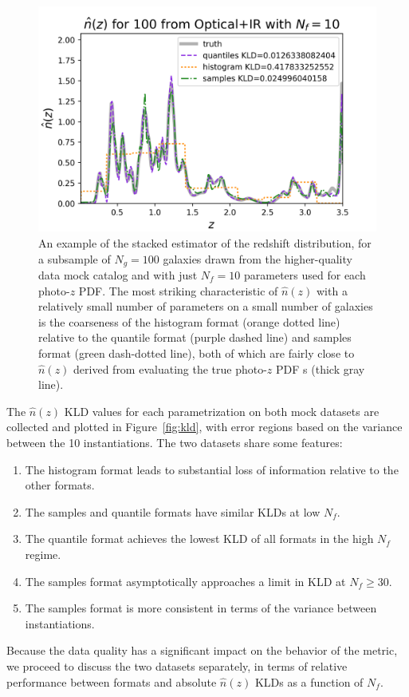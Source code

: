 \documentclass[\docopts]{\docclass}
\newcommand{\pz}{photo-$z$ PDF\xspace}
\begin{document}
\begin{figure}
  \includegraphics[width=0.9\columnwidth]{figures/graham_stacked.png}
  \caption{An example of the stacked estimator of the redshift distribution, 
for a subsample of $N_{g}=100$ galaxies drawn from the higher-quality data mock 
catalog and with just $N_{f}=10$ parameters used for each \pz.
  The most striking characteristic of $\hat{n}(z)$ with a relatively small 
number of parameters on a small number of galaxies is the coarseness of the 
histogram format (orange dotted line) relative to the quantile format (purple 
dashed line) and samples format (green dash-dotted line), both of which are 
fairly close to $\hat{n}(z)$ derived from evaluating the true \pz s (thick gray 
line).
  \label{fig:stacked}}
\end{figure}

The $\hat{n}(z)$ KLD values for each parametrization on both mock datasets are 
collected and plotted in Figure~\ref{fig:kld}, with error regions based on the 
variance between the 10 instantiations.
The two datasets share some features:
\begin{enumerate}
\item The histogram format leads to substantial loss of information relative to 
the other formats.
\item The samples and quantile formats have similar KLDs at low $N_{f}$.
\item The quantile format achieves the lowest KLD of all formats in the high 
$N_{f}$ regime.
\item The samples format asymptotically approaches a limit in KLD at 
$N_{f}\geq30$.
\item The samples format is more consistent in terms of the variance between 
instantiations.
\end{enumerate}
Because the data quality has a significant impact on the behavior of the 
metric, we proceed to discuss the two datasets separately, in terms of relative 
performance between formats and absolute $\hat{n}(z)$ KLDs as a function of 
$N_{f}$.
\end{document}
